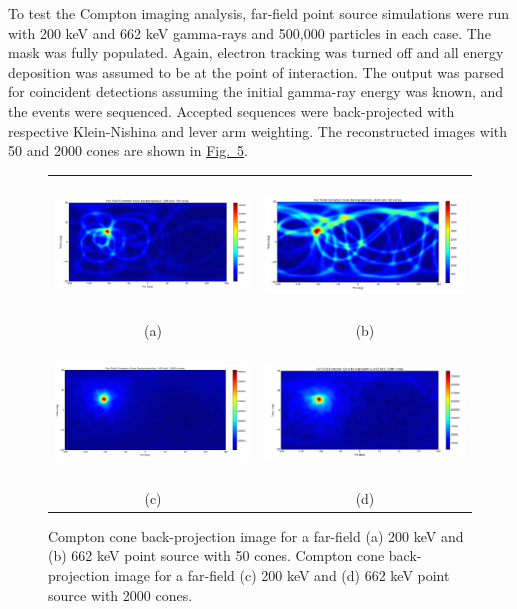 \documentclass[10pt]{article}
\begin{document}
To test the Compton imaging analysis, far-field point source simulations were run with 200 keV and 662 keV gamma-rays and 500,000 particles in each case. The mask was fully populated. Again, electron tracking was turned off and all energy deposition was assumed to be at the point of interaction. The output was parsed for coincident detections assuming the initial gamma-ray energy was known, and the events were sequenced. Accepted sequences were back-projected with respective Klein-Nishina and lever arm weighting. The reconstructed images with 50 and 2000 cones are shown in \hyperlink{fig5}{Fig.~5}. 

\begin{figure}[htb!]
\hypertarget{fig5}{}
\centering
\begin{tabular}{cc}
	\includegraphics[height=100pt]{Figures/Compton_200_50cones.png} & 
	\includegraphics[height=100pt]{Figures/Compton_662_50cones.png} \\ [-0.5ex]
	\scriptsize{(a)} & \scriptsize{(b)} \\ [1ex]
	\includegraphics[height=100pt]{Figures/Compton_200_2000cones.png} & 
	\includegraphics[height=100pt]{Figures/Compton_662_2000cones.png} \\ [-0.5ex]
	\scriptsize{(c)} & \scriptsize{(d)}
\end{tabular}
\caption{Compton cone back-projection image for a far-field (a) 200 keV and (b) 662 keV point source with 50 cones. Compton cone back-projection image for a far-field (c) 200 keV and (d) 662 keV point source with 2000 cones.}
\end{figure}
\end{document}
